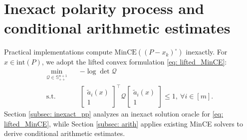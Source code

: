 \documentclass[smallextended]{svjour3}
\renewcommand{\S}{\mathbb{S}}
\begin{document}
\section{Inexact polarity process and conditional arithmetic estimates}\label{sec:inexact-polarity-process}
Practical implementations compute $\mathrm{MinCE}((P-x_k)^\circ)$ inexactly.
For $x\in\mathrm{int}(P)$, we adopt the lifted convex formulation
\eqref{eq: lifted_MinCE}:
\begin{align*}
    \min_{\mathcal{Q} \in \S^{n+1}_{++}} \quad & -\log \det \mathcal{Q} \\
    \mathrm{s.t.}\quad &
    \begin{bmatrix}
        \tilde{a}_i(x)\\ 1
    \end{bmatrix}^\top
    \mathcal{Q}
    \begin{bmatrix}
        \tilde{a}_i(x)\\ 1
    \end{bmatrix} \leq 1, ~\forall i\in[m].
\end{align*}
Section \ref{subsec: inexact_pp} analyzes an inexact solution oracle for
\eqref{eq: lifted_MinCE}, while Section
\ref{subsec: arith} applies existing MinCE solvers to derive conditional arithmetic estimates.
\end{document}
